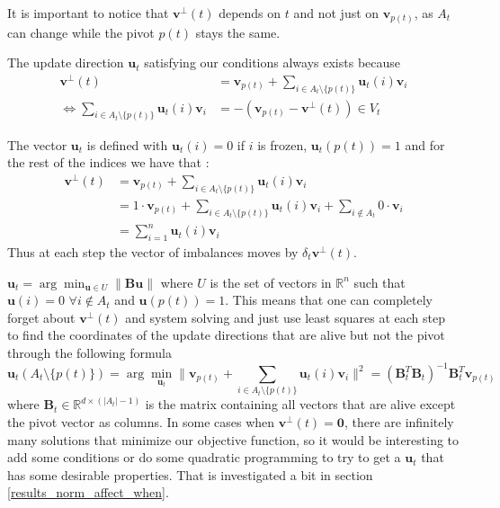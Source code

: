\documentclass[12pt]{article}
\begin{document}
It is important to notice that $\textbf{v}^{\perp}(t)$ depends on $t$ and not just on $\textbf{v}_{p(t)}$, as $A_t$ can change while the pivot $p(t)$ stays the same.

The update direction $\textbf{u}_t$ satisfying our conditions always exists because
\begin{align*}
        \textbf{v}^\perp(t) &= \textbf{v}_{p(t)} + \sum_{i \in A_t \setminus \{p(t)\}} \textbf{u}_t(i)\textbf{v}_i\\
        \Leftrightarrow\sum_{i \in A_t \setminus \{p(t)\}} \textbf{u}_t(i)\textbf{v}_i &= -\left(\textbf{v}_{p(t)} - \textbf{v}^\perp(t)\right) \in V_t
\end{align*}

The vector $\textbf{u}_t$ is defined with $\textbf{u}_t(i)=0$ if $i$ is frozen, $\textbf{u}_t(p(t))=1$ and for the rest of the indices we have that :
\begin{align*}
\textbf{v}^\perp(t) &= \textbf{v}_{p(t)} + \sum_{i \in A_t \setminus \{p(t)\}} \textbf{u}_t(i)\textbf{v}_i\\
&= 1 \cdot \textbf{v}_{p(t)} + \sum_{i \in A_t \setminus \{p(t)\}} \textbf{u}_t(i)\textbf{v}_i + \sum_{i \notin A_t} 0 \cdot \textbf{v}_i\\
&= \sum_{i=1}^n \textbf{u}_t(i)\textbf{v}_i
\end{align*}
Thus at each step the vector of imbalances moves by $\delta_t\textbf{v}^\perp(t)$.

$\textbf{u}_t = \arg\min_{\textbf{u} \in U} \|\textbf{Bu}\|$ where $U$ is the set of vectors in $\mathbb{R}^n$ such that $\textbf{u}(i) = 0$ $\forall i \not\in A_t$ and $\textbf{u}(p(t))=1$. This means that one can completely forget about $\textbf{v}^\perp(t)$ and system solving and just use least squares at each step to find the coordinates of the update directions that are alive but not the pivot through the following formula $$\textbf{u}_t(A_t\setminus\{p(t)\})=\arg\min_{\textbf{u}_t}\|\textbf{v}_{p(t)}+\sum_{i\in A_t\setminus\{p(t)\}}\textbf{u}_t(i)\textbf{v}_i\|^2=\left(\textbf{B}_t^T\textbf{B}_t\right)^{-1}\textbf{B}_t^T\textbf{v}_{p(t)}$$ where $\textbf{B}_t\in\mathbb{R}^{d\times(|A_t|-1)}$ is the matrix containing all vectors that are alive except the pivot vector as columns. In some cases when $\textbf{v}^\perp(t)=\textbf{0}$, there are infinitely many solutions that minimize our objective function, so it would be interesting to add some conditions or do some quadratic programming to try to get a $\textbf{u}_t$ that has some desirable properties. That is investigated a bit in section \ref{results_norm_affect_when}.
\end{document}
